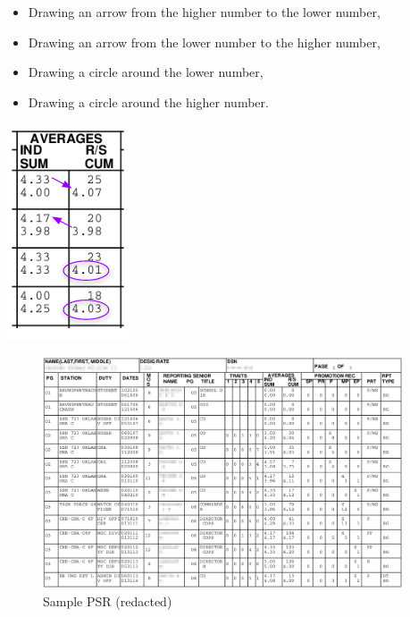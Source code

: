 \documentclass[UTF8]{article}
\begin{document}
\begin{minipage}{0.7\linewidth}
\begin{itemize}
  \item Drawing an arrow from the higher number to the lower number,
  \item Drawing an arrow from the lower number to the higher number,
  \item Drawing a circle around the lower number,
  \item Drawing a circle around the higher number.
\end{itemize}
\end{minipage}
\hfill
\begin{minipage}{0.3\linewidth}
  \includegraphics[width=0.4\linewidth]{inconsisent_annotations.png}\\
\end{minipage}


\begin{figure}[h!]
 \centering
 \includegraphics[width=0.95\textwidth]{blurred_psr.png}
 \caption{Sample PSR (redacted)}
\end{figure}
\end{document}
